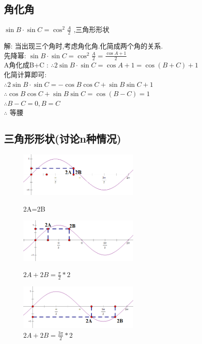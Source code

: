 \documentclass[hyperref, UTF8,11pt,a4paper]{ctexart} %
\begin{document}
\subsection{角化角}
 {\color{red} $\sin B \cdot \sin C=\cos ^{2} \frac{A}{2}$ ,三角形形状 }

解:{\color{blue} 当出现三个角时,考虑角化角.化简成两个角的关系.} \\
先降幂: $\sin B \cdot \sin C=\cos ^{2} \frac{A}{2}=\frac{\cos A+1}{2}$ \\
{\color{blue} A角化成B+C }: $\therefore 2 \sin B \cdot \sin C = \cos A+1 =\cos(B+C)+1$ \\
化简计算即可: \\
$\therefore 2 \sin B \cdot \sin C=-\cos B \cos C+\sin B \sin C+1$ \\
$\therefore \cos B \cos C+\sin B \sin C=\cos (B-C)=1$ \\
$\therefore B-C=0, B=C$ \\
$\therefore$ 等腰

\subsection{三角形形状(讨论n种情况)}

\begin{figure}[htbp] %
	\centering
	\begin{minipage}{170pt}
		\centering
		\includegraphics[width=170pt]  {pic/zhengyuxian/2A=2B.png}
		\caption{2A=2B}
	\end{minipage}
	\hspace{10pt}
	\begin{minipage}{170pt}
		\centering
		\includegraphics[width=170pt]  {pic/zhengyuxian/2A=2B1.png}
		\caption{$ 2A+2B= \frac{\pi}{2} * 2 $}
	\end{minipage}
	\hspace{10pt}
	\begin{minipage}{170pt}
		\centering
		\includegraphics[width=170pt]  {pic/zhengyuxian/2A=2B2.png}
		\caption{$ 2A+2B= \frac{3\pi}{2} * 2 $}
	\end{minipage}
\end{figure}
\end{document}
